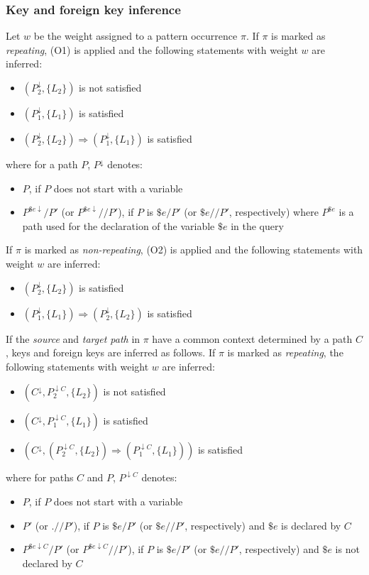 \subsubsection{Key and foreign key inference}
Let $w$ be the weight assigned to a pattern occurrence $\pi$. If $\pi$ is marked as \emph{repeating}, (O1) is applied and the following statements with weight $w$ are inferred:
\begin{itemize}
\item $(P_2^{\downarrow}, \{L_2\})$ is not satisfied
\item $(P_1^{\downarrow}, \{L_1\})$ is satisfied
\item $(P_2^{\downarrow}, \{L_2\}) \Rightarrow (P_1^{\downarrow}, \{L_1\})$ is satisfied
\end{itemize}
where for a path $P$, $P^{\downarrow}$ denotes:
\begin{itemize}
\item $P$, if $P$ does not start with a variable
\item $P^{\$e\downarrow}/P'$ (or $P^{\$e\downarrow}//P'$), if $P$ is $\$e/P'$ (or $\$e//P'$, respectively) where $P^{\$e}$ is a path used for the declaration of the variable $\$e$ in the query
\end{itemize}

If $\pi$ is marked as \emph{non-repeating}, (O2) is applied and the following statements with weight $w$ are inferred:
\begin{itemize}
\item $(P_2^{\downarrow}, \{L_2\})$ is satisfied
\item $(P_1^{\downarrow}, \{L_1\}) \Rightarrow (P_2^{\downarrow}, \{L_2\})$ is satisfied
\end{itemize}

If the \emph{source} and \emph{target path} in $\pi$ have a common context determined by a path $C$, keys and foreign keys are inferred as follows. If $\pi$ is marked as \emph{repeating}, the following statements with weight $w$ are inferred:
\begin{itemize}
\item $(C^{\downarrow}, P_2^{\downarrow C}, \{L_2\})$ is not satisfied
\item $(C^{\downarrow}, P_1^{\downarrow C}, \{L_1\})$ is satisfied
\item $(C^{\downarrow}, (P_2^{\downarrow C}, \{L_2\}) \Rightarrow (P_1^{\downarrow C}, \{L_1\}))$ is satisfied
\end{itemize}
where for paths $C$ and $P$, $P^{\downarrow C}$ denotes:
\begin{itemize}
\item $P$, if $P$ does not start with a variable
\item $P'$ (or $.//P'$), if $P$ is $\$e/P'$ (or $\$e//P'$, respectively) and $\$e$ is declared by $C$
\item $P^{\$e\downarrow C}/P'$ (or $P^{\$e\downarrow C}//P'$), if $P$ is $\$e/P'$ (or $\$e//P'$, respectively) and $\$e$ is not declared by $C$
\end{itemize}

